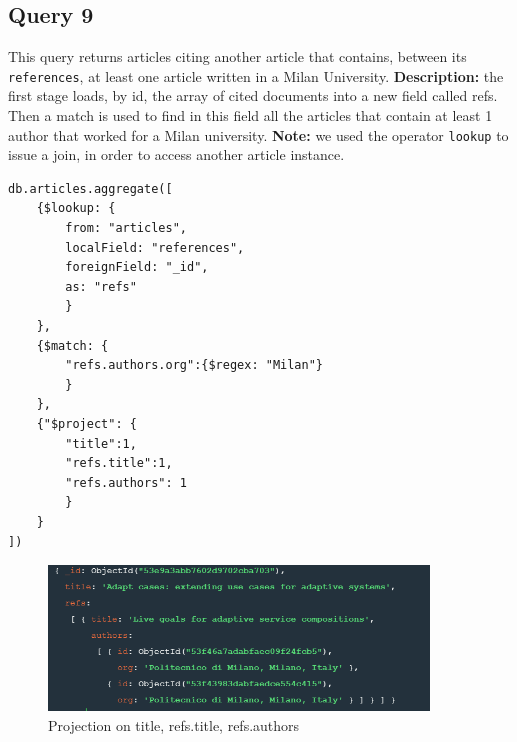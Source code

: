 \documentclass{Configuration_Files/PoliMi3i_thesis}
\begin{document}
\subsection{Query 9}
This query returns articles citing another article that contains, between its \verb |references|, at least one
article written in a Milan University. \newline
\textbf{Description:} the first stage loads, by id, the array of cited documents into a new field called refs.
Then a match is used to find in this field all the articles that contain at least 1 author that worked for
a Milan university.\newline
\textbf{Note:} we used the operator \verb |lookup| to issue a join, in order to access another article instance.
\begin{lstlisting}
db.articles.aggregate([
	{$lookup: {
		from: "articles",
		localField: "references",
		foreignField: "_id",
		as: "refs"
		}
	},
	{$match: {
		"refs.authors.org":{$regex: "Milan"}
		}
	},
	{"$project": {
		"title":1,
		"refs.title":1,
		"refs.authors": 1
		}
	}
])
\end{lstlisting}
\begin{figure}[H]
\centering
\includegraphics[width=0.9\textwidth]{query/mongo_q9.PNG}
\caption{Projection on title, refs.title, refs.authors}
\label{fig:query9}
\end{figure}
\end{document}
